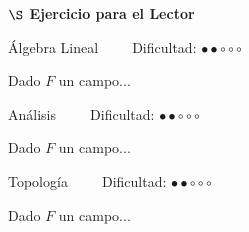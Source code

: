 


\begin{center}
    {\large \textbf{ $\S$ Ejercicio para el Lector}} {$~$\small\faGlasses}
\end{center}

\begin{center}
    Álgebra Lineal $~~~~~~~~$ Dificultad: $\bullet \bullet \circ \circ\circ $
\end{center}

{\fontsize{7}{5} 
Dado $F$ un campo...
}

\begin{center}
    Análisis $~~~~~~~~$ Dificultad: $\bullet \bullet \circ \circ\circ $
\end{center}

{\fontsize{7}{5} 
Dado $F$ un campo...
}

\begin{center}
    Topología $~~~~~~~~$ Dificultad: $\bullet \bullet \circ \circ\circ $
\end{center}

{\fontsize{7}{5} 
Dado $F$ un campo...
}

